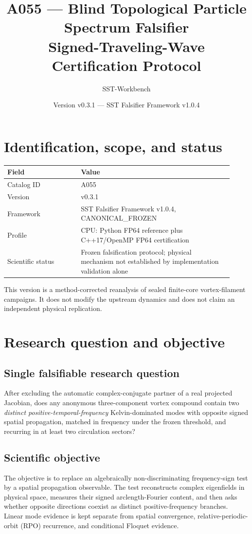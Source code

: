 \documentclass[11pt,a4paper]{article}
\title{A055 --- Blind Topological Particle Spectrum Falsifier\\Signed-Traveling-Wave Certification Protocol}
\author{SST-Workbench}
\date{Version v0.3.1 --- SST Falsifier Framework v1.0.4}
\begin{document}
\maketitle

\section{Identification, scope, and status}
\begin{longtable}{p{0.30\linewidth}p{0.62\linewidth}}
\toprule Field & Value \\
\midrule
Catalog ID & A055 \\
Version & v0.3.1 \\
Framework & SST Falsifier Framework v1.0.4, CANONICAL\_FROZEN \\
Profile & CPU: Python FP64 reference plus C++17/OpenMP FP64 certification \\
Scientific status & Frozen falsification protocol; physical mechanism not established by implementation validation alone \\
\bottomrule
\end{longtable}
This version is a method-corrected reanalysis of sealed finite-core vortex-filament campaigns. It does not modify the upstream dynamics and does not claim an independent physical replication.

\section{Research question and objective}
\subsection{Single falsifiable research question}
After excluding the automatic complex-conjugate partner of a real projected Jacobian, does any anonymous three-component vortex compound contain two \emph{distinct positive-temporal-frequency} Kelvin-dominated modes with opposite signed spatial propagation, matched in frequency under the frozen threshold, and recurring in at least two circulation sectors?

\subsection{Scientific objective}
The objective is to replace an algebraically non-discriminating frequency-sign test by a spatial propagation observable. The test reconstructs complex eigenfields in physical space, measures their signed arclength-Fourier content, and then asks whether opposite directions coexist as distinct positive-frequency branches. Linear mode evidence is kept separate from spatial convergence, relative-periodic-orbit (RPO) recurrence, and conditional Floquet evidence.
\end{document}
